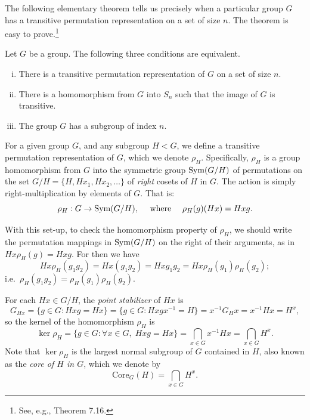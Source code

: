 The following elementary theorem tells us precisely when a particular group $G$
has a transitive permutation representation on a set of size $n$.
The theorem is easy to prove.\footnote{See, e.g., \cite{Suzuki:1982} Theorem
  7.16.}
\begin{theorem}
  Let $G$ be a group.  The following three conditions are equivalent.
  \begin{enumerate}[(i)]
  \item There is a transitive permutation representation of $G$ on a set of size
    $n$.
  \item There is a homomorphism from $G$ into $S_n$ such that the image of $G$
    is transitive. 
  \item The group $G$ has a subgroup of index $n$.
  \end{enumerate}
\end{theorem}

\newcommand{\Core}{\ensuremath{\mathrm{Core}}}
For a given group $G$, and any subgroup $H< G$,
we define a transitive permutation representation of $G$, which we
denote $\rho_H$.  Specifically, $\rho_H$ is a group homomorphism from $G$ into
the symmetric group $\mathrm{Sym}(G/H)$ of permutations on the set $G/H = \{H, Hx_1,
Hx_2, \dots \}$ of \emph{right} cosets of $H$ in $G$.
The action is simply right-multiplication by elements of $G$. That is:
\[
\rho_H : G \rightarrow \mathrm{Sym}(G/H), \quad \text{ where } \quad 
\rho_H(g)(Hx)= Hxg.
\]

With this set-up, to check the homomorphism property of $\rho_H$, 
we should write the permutation mappings in $\mathrm{Sym}(G/H)$ on the
right of their arguments, as in $Hx \rho_H(g) = Hxg$.  For then we have
\[
Hx \rho_H(g_1 g_2) = Hx (g_1 g_2) = Hx g_1 g_2 = Hx\rho_H(g_1)\rho_H(g_2);
\] 
i.e.~$\rho_H(g_1 g_2) = \rho_H(g_1)\rho_H(g_2)$.

For each $Hx \in G/H$, the \emph{point stabilizer} of $Hx$ is 
\[
G_{Hx} = \{g\in G : Hxg = Hx \} = 
\{g\in G : Hxgx^{-1}  = H \} = 
x^{-1} G_H x  = x^{-1} H x = H^x,
\]
so the kernel of the homomorphism $\rho_H$ is 
\[
\ker \rho_H = \{g\in G : \forall x \in G,\; Hxg = Hx \} = 
\bigcap_{x\in G} x^{-1} H x = \bigcap_{x\in G} H^x.
\]
Note that $\ker \rho_H$ is the largest normal subgroup of $G$ 
contained in $H$, also known as the \emph{core of $H$ in $G$}, which we denote
by 
\[
\Core_G(H) = \bigcap_{x\in G} H^x.
\]

